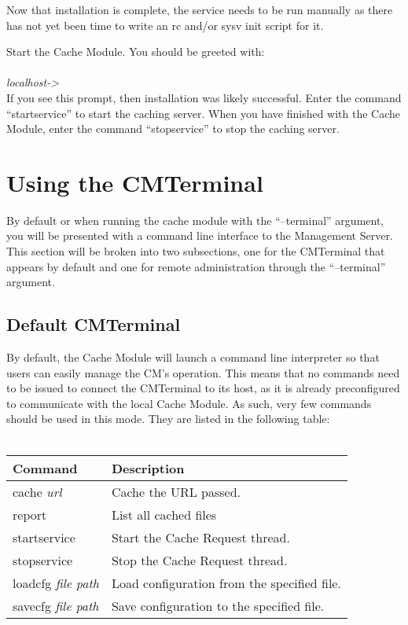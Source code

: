 \documentclass[letterpaper]{article}
\begin{document}
Now that installation is complete, the service needs to be run manually as there has not yet been time to write an rc and/or sysv init script for it.

Start the Cache Module. You should be greeted with:\\
\\
\textit{localhost-> }\\
If you see this prompt, then installation was likely successful. Enter the command ``startservice'' to start the caching server. When you have finished with the Cache Module, enter the command ``stopservice'' to stop the caching server.

\section{Using the CMTerminal}
By default or when running the cache module with the ``--terminal'' argument, you will be presented with a command line interface to the Management Server. This section will be broken into two subsections, one for the CMTerminal that appears by default and one for remote administration through the ``--terminal'' argument.

\subsection{Default CMTerminal}
By default, the Cache Module will launch a command line interpreter so that users can easily manage the CM's operation. This means that no commands need to be issued to connect the CMTerminal to its host, as it is already preconfigured to communicate with the local Cache Module. As such, very few commands should be used in this mode. They are listed in the following table:
\\
\\
\begin{tabular}{|l|l|}
\hline
\textbf{Command} & \textbf{Description}\\
\hline
\hline
cache \textit{url} & Cache the URL passed. \\
\hline
report & List all cached files \\
\hline
startservice & Start the Cache Request thread. \\
\hline
stopservice & Stop the Cache Request thread. \\
\hline
loadcfg \textit{file path} & Load configuration from the specified file. \\
\hline
savecfg \textit{file path} & Save configuration to the specified file. \\
\hline
\end{tabular}
\end{document}
